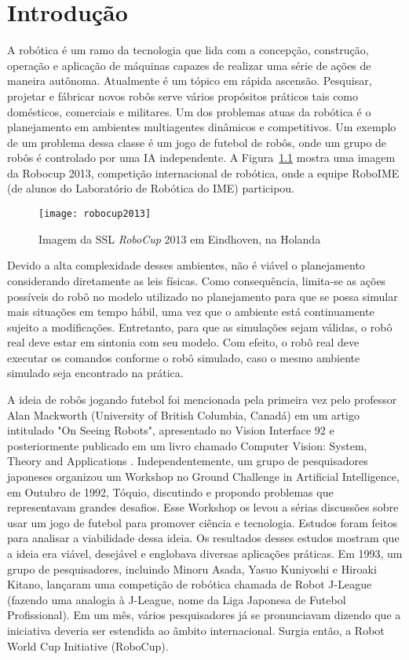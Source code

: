 \chapter{Introdução}

A robótica é um ramo da tecnologia que lida com a concepção, construção,
operação e aplicação de máquinas capazes de realizar uma série de ações de
maneira autônoma.  Atualmente é um tópico em rápida ascensão.  Pesquisar,
projetar e fábricar novos robôs serve vários propósitos práticos tais como
domésticos, comerciais e militares.  Um dos problemas atuas da robótica é o
planejamento em ambientes multiagentes dinâmicos e competitivos.  Um exemplo de
um problema dessa classe é um jogo de futebol de robôs, onde um grupo de robôs é
controlado por uma IA independente.  A Figura~\ref{fig:robocup2013} mostra uma
imagem da Robocup 2013, competição internacional de robótica, onde a equipe
RoboIME (de alunos do Laboratório de Robótica do IME) participou.

\begin{figure}[h]
  \centering
  \texttt{[image: robocup2013]}
  \caption{Imagem da SSL \textit{RoboCup} 2013 em Eindhoven, na Holanda}\label{fig:robocup2013}
\end{figure}

Devido a alta complexidade desses ambientes, não é viável o planejamento
considerando diretamente as leis físicas.  Como consequência, limita-se as ações
possíveis do robô no modelo utilizado no planejamento para que se possa simular
mais situações em tempo hábil, uma vez que o ambiente está continuamente sujeito
a modificações.  Entretanto, para que as simulações sejam válidas, o robô real
deve estar em sintonia com seu modelo.  Com efeito, o robô real deve executar os
comandos conforme o robô simulado, caso o mesmo ambiente simulado seja
encontrado na prática.

A ideia de robôs jogando futebol foi mencionada pela primeira vez pelo professor
Alan Mackworth (University of British Columbia, Canadá) em um artigo intitulado
"On Seeing Robots", apresentado no Vision Interface 92 e posteriormente
publicado em um livro chamado Computer Vision: System, Theory and Applications
\cite{basu1993computer}.  Independentemente, um grupo de pesquisadores japoneses
organizou um Workshop no Ground Challenge in Artificial Intelligence, em Outubro
de 1992, Tóquio, discutindo e propondo problemas que representavam grandes
desafios.  Esse Workshop os levou a sérias discussões sobre usar um jogo de
futebol para promover ciência e tecnologia.  Estudos foram feitos para analisar
a viabilidade dessa ideia.  Os resultados desses estudos mostram que a ideia era
viável, desejável e englobava diversas aplicações práticas.  Em 1993, um grupo
de pesquisadores, incluindo Minoru Asada, Yasuo Kuniyoshi e Hiroaki Kitano,
lançaram uma competição de robótica chamada de Robot J-League (fazendo uma
analogia à J-League, nome da Liga Japonesa de Futebol Profissional).  Em um mês,
vários pesquisadores já se pronunciavam dizendo que a iniciativa deveria ser
estendida ao âmbito internacional.  Surgia então, a Robot World Cup Initiative
(RoboCup).

